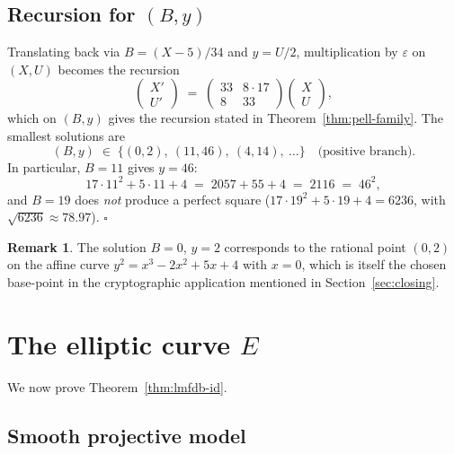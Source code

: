 \documentclass[11pt,a4paper]{article}
\theoremstyle{plain}
\theoremstyle{definition}
\newtheorem{remark}[theorem]{Remark}
\begin{document}
\subsection{Recursion for $(B,y)$}
Translating back via $B = (X - 5)/34$ and $y = U/2$, multiplication by
$\varepsilon$ on $(X,U)$ becomes the recursion
\begin{equation}
  \label{eq:By-recursion}
  \begin{pmatrix} X' \\ U' \end{pmatrix}
  \;=\;
  \begin{pmatrix} 33 & 8 \cdot 17 \\ 8 & 33 \end{pmatrix}
  \begin{pmatrix} X \\ U \end{pmatrix},
\end{equation}
which on $(B,y)$ gives the recursion stated in
Theorem~\ref{thm:pell-family}. The smallest solutions are
\begin{equation*}
  (B,y) \;\in\; \{(0,2),\ (11, 46),\ (4, 14),\ \ldots\}
  \quad\text{(positive branch)}.
\end{equation*}
In particular, $B=11$ gives $y=46$:
\begin{equation*}
  17 \cdot 11^2 + 5 \cdot 11 + 4 \;=\; 2057 + 55 + 4 \;=\; 2116 \;=\; 46^2,
\end{equation*}
and $B = 19$ does \emph{not} produce a perfect square
($17 \cdot 19^2 + 5 \cdot 19 + 4 = 6236$, with $\sqrt{6236} \approx 78.97$).
\hfill$\square$

\begin{remark}
The solution $B = 0$, $y = 2$ corresponds to the rational point
$(0, 2)$ on the affine curve $y^2 = x^3 - 2x^2 + 5x + 4$ with $x = 0$,
which is itself the chosen base-point in the cryptographic application
mentioned in Section~\ref{sec:closing}.
\end{remark}

\section{The elliptic curve $E$}
\label{sec:curve}

We now prove Theorem~\ref{thm:lmfdb-id}.

\subsection{Smooth projective model}
\end{document}
